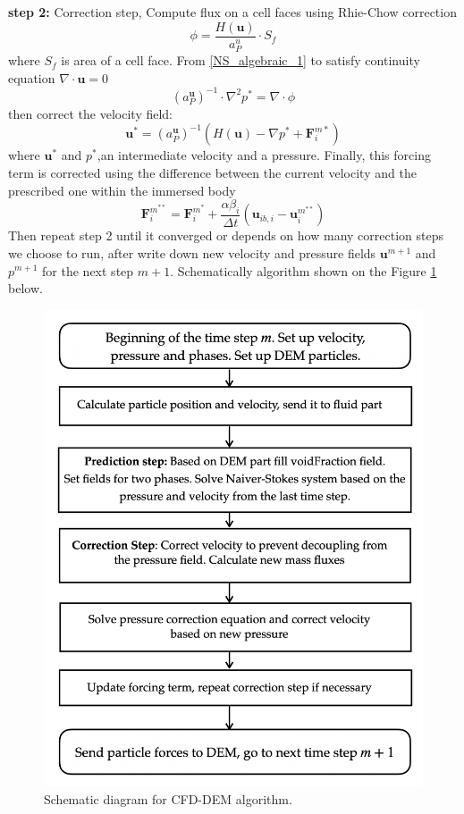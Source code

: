 \textbf{step 2:} Correction step,
Compute flux on a cell faces using Rhie-Chow \cite{rhie} correction
\begin{equation}
    \phi = \frac{H(\mathbf{u})}{a^u_P}\cdot S_f
\end{equation}
where $S_f$ is area of a cell face.
From \ref{NS_algebraic_1} to satisfy continuity equation $\nabla\cdot \mathbf{u} = 0$
\begin{equation}
    (a_{P}^{\mathbf{u}})^{-1} \cdot \nabla^2 p^* = \nabla \cdot \phi
\end{equation}
then correct the velocity field:
\begin{equation}
    \mathbf{u}^{*} = (a_{P}^{\mathbf{u}})^{-1}(H(\mathbf{u}) - \nabla p^* + \mathbf{F}^{m*}_i)
\end{equation}
where $\mathbf{u}^*$ and $p^*$,an intermediate velocity and a pressure. Finally, this forcing term is corrected using the difference between the current velocity and the prescribed one within the immersed body
\begin{equation}
\mathbf{F}_{i}^{m^{* *}} = \boldsymbol{F}_{i}^{m^{*}}+\frac{\alpha \beta_{i}}{\Delta t}\left(\boldsymbol{u}_{i b, i}-\boldsymbol{u}_{i}^{m^{* *}}\right)
\end{equation}
Then repeat step 2 until it converged or depends on how many correction steps we choose to run, after write down new velocity and pressure fields $\mathbf{u}^{m+1}$ and $p^{m+1}$ for the next step $m + 1$. Schematically algorithm shown on the Figure \ref{fig:diag_PISO} below.

\begin{figure}[!h]
    \centering
    \includegraphics[width=12cm]{Images/chap3/diag_PISO.png}
    \caption{Schematic diagram for CFD-DEM algorithm.}
    \label{fig:diag_PISO}
\end{figure}

